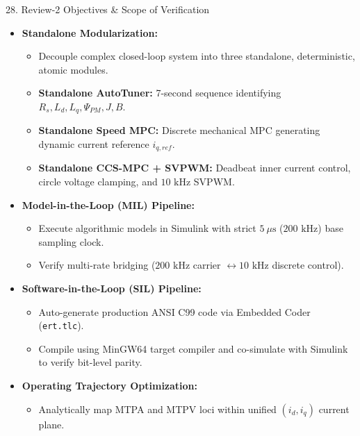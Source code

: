 \documentclass[aspectratio=169]{beamer}
\begin{document}
\begin{frame}{28. Review-2 Objectives \& Scope of Verification}
    \begin{itemize}
        \item \textbf{Standalone Modularization:}
        \begin{itemize}
            \item Decouple complex closed-loop system into three standalone, deterministic, atomic modules.
            \item \textbf{Standalone AutoTuner:} 7-second sequence identifying $R_s, L_d, L_q, \Psi_{PM}, J, B$.
            \item \textbf{Standalone Speed MPC:} Discrete mechanical MPC generating dynamic current reference $i_{q,ref}$.
            \item \textbf{Standalone CCS-MPC + SVPWM:} Deadbeat inner current control, circle voltage clamping, and $10\text{ kHz}$ SVPWM.
        \end{itemize}
        \item \textbf{Model-in-the-Loop (MIL) Pipeline:}
        \begin{itemize}
            \item Execute algorithmic models in Simulink with strict $5\ \mu\text{s}$ ($200\text{ kHz}$) base sampling clock.
            \item Verify multi-rate bridging ($200\text{ kHz}$ carrier $\leftrightarrow 10\text{ kHz}$ discrete control).
        \end{itemize}
        \item \textbf{Software-in-the-Loop (SIL) Pipeline:}
        \begin{itemize}
            \item Auto-generate production ANSI C99 code via Embedded Coder (\texttt{ert.tlc}).
            \item Compile using MinGW64 target compiler and co-simulate with Simulink to verify bit-level parity.
        \end{itemize}
        \item \textbf{Operating Trajectory Optimization:}
        \begin{itemize}
            \item Analytically map MTPA and MTPV loci within unified $(i_d, i_q)$ current plane.
        \end{itemize}
    \end{itemize}
\end{frame}
\end{document}

